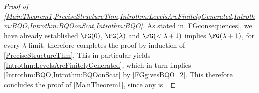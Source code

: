 \begin{proof}[Proof of \cref{MainTheorem1,PreciseStructureThm,Introthm:LevelsAreFinitelyGenerated,Introthm:BQO,Introthm:BQOonScat,Introthm:BQO}]
As stated in \cref{FGconsequences}, we have already established $\FG(0)$, $\FG(\lambda)$ and $\FG(<\lambda+1)$ implies $\FG(\lambda+1)$, for every $\lambda$ limit.
 therefore completes the proof by induction of \cref{PreciseStructureThm}.
This in particular yields \cref{Introthm:LevelsAreFinitelyGenerated}, which in turn implies \cref{Introthm:BQO,Introthm:BQOonScat} by \cref{FGgivesBQO_2}.
This therefore concludes the proof of \cref{MainTheorem1}, since any \bqo{} is \wqo{}.
\end{proof}





